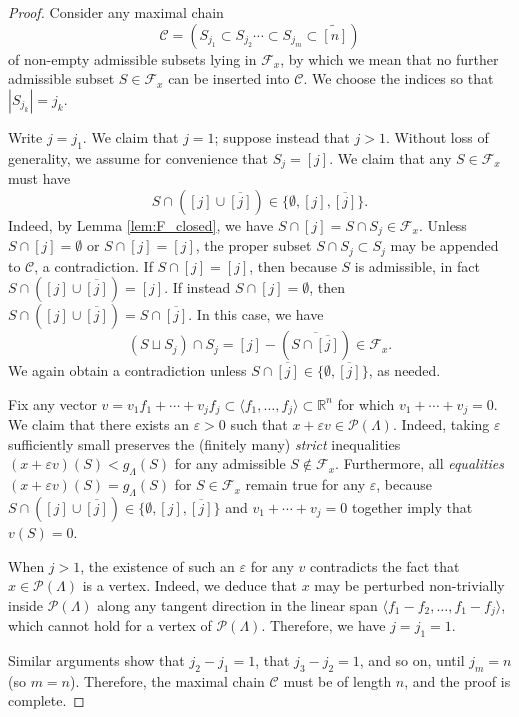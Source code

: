 \documentclass[12pt]{amsart}
\newcommand{\cC}{\mathcal{C}}
\newcommand{\cF}{\mathcal{F}}
\newcommand{\cP}{\mathcal{P}}
\newcommand{\bR}{\mathbb{R}}
\newcommand{\wtn}{\widetilde{[n]}}
\begin{document}
\begin{proof}
Consider any maximal chain
\begin{equation*}
     \cC=(S_{j_1} \subset S_{j_2}\cdots\subset S_{j_m}\subset \wtn)
 \end{equation*}
of non-empty admissible subsets lying in $\cF_x$, by which we mean that no further admissible subset $S\in\cF_x$ can be inserted into $\cC$. We choose the indices so that $|S_{j_k}|=j_k$.

Write $j=j_1$. We claim that $j=1$; suppose instead that $j>1$. Without loss of generality, we assume for convenience that $S_{j}=[j]$. We claim that any $S\in \cF_x$ must have
\begin{equation*}
    S\cap ([j]\cup\overline{[j]})\in\{\emptyset,[j],\overline{[j]}\}.
\end{equation*}
Indeed, by Lemma \ref{lem:F_closed}, we have $S\cap [j]=S\cap S_j\in \cF_x$. Unless $S\cap [j]=\emptyset$ or $S\cap [j]=[j]$, the proper subset $S\cap S_j\subset S_j$ may be appended to $\cC$, a contradiction. If $S\cap [j]=[j]$, then because $S$ is admissible, in fact $S\cap ([j]\cup\overline{[j]})=[j]$. If instead $S\cap [j]=\emptyset$, then $S\cap ([j]\cup\overline{[j]})=S\cap\overline{[j]}$. In this case, we have
\begin{equation*}
    (S\sqcup S_j)\cap S_j=[j]-(\overline{S\cap\overline{[j]}})\in \cF_x.
\end{equation*}
We again obtain a contradiction unless $S\cap\overline{[j]}\in \{\emptyset,\overline{[j]}\}$, as needed.

Fix any vector $v=v_1f_1+\cdots+v_jf_j\subset\langle f_1,\ldots,f_j\rangle \subset \bR^n$ for which $v_1+\cdots+v_j=0$. We claim that there exists an $\varepsilon>0$ such that $x+\varepsilon v\in \cP(\Lambda)$. Indeed, taking $\varepsilon$ sufficiently small preserves the (finitely many) \emph{strict} inequalities $(x+\varepsilon v)(S)<g_\Lambda(S)$ for any admissible $S\notin\cF_x$. Furthermore, all \emph{equalities} $(x+\varepsilon v)(S)=g_\Lambda(S)$ for $S\in\cF_x$ remain true for any $\varepsilon$, because $S\cap ([j]\cup\overline{[j]})\in\{\emptyset,[j],\overline{[j]}\}$ and $v_1+\cdots+v_j=0$ together imply that $v(S)=0$.

When $j>1$, the existence of such an $\varepsilon$ for any $v$ contradicts the fact that $x\in\cP(\Lambda)$ is a vertex. Indeed, we deduce that $x$ may be perturbed non-trivially inside $\cP(\Lambda)$ along any tangent direction in the linear span $\langle f_1-f_2,\ldots,f_1-f_j\rangle$, which cannot hold for a vertex of $\cP(\Lambda)$. Therefore, we have $j=j_1=1$.

Similar arguments show that $j_2-j_1=1$, that $j_3-j_2=1$, and so on, until $j_m=n$ (so $m=n$). Therefore, the maximal chain $\cC$ must be of length $n$, and the proof is complete.
\end{proof}
\end{document}
